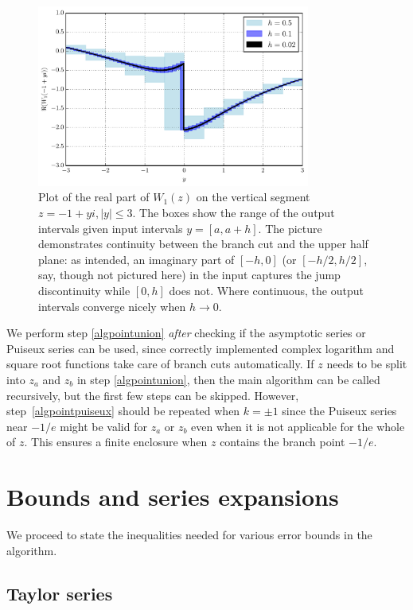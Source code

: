 \documentclass[11pt,a4paper]{article}
\begin{document}
\begin{figure}
\begin{centering}
\includegraphics[width=0.8\textwidth]{plotb1y}
\caption{
Plot of the real part of $W_1(z)$ on the vertical segment $z = -1 + yi, |y| \le 3$.
The boxes show the range of the output intervals given input intervals $y = [a,a+h]$.
The picture demonstrates continuity between the branch cut and the upper half plane: as intended, an imaginary part of $[-h,0]$
(or $[-h/2,h/2]$, say, though not pictured here) in the input
captures the jump discontinuity while $[0,h]$ does not.
Where continuous, the output intervals converge nicely when $h \to 0$.
}
\end{centering}
\end{figure}

We perform step \ref{algpointunion} \emph{after} checking if the asymptotic series or Puiseux
series can be used, since correctly implemented
complex logarithm and square root functions
take care of branch cuts automatically.
If $z$ needs to be split into $z_a$ and $z_b$ in step \ref{algpointunion},
then the main algorithm can
be called recursively, but the first few steps can be skipped.
However, step~\ref{algpointpuiseux} should be repeated
when $k = \pm 1$
since the Puiseux series near $-1/e$ might be valid
for $z_a$ or $z_b$
even when it is not applicable for the whole of $z$.
This ensures a finite enclosure when $z$ contains the branch point $-1/e$.

\section{Bounds and series expansions}
\label{sect:series}

We proceed to state the inequalities needed
for various error bounds in the algorithm.

\subsection{Taylor series}
\end{document}
